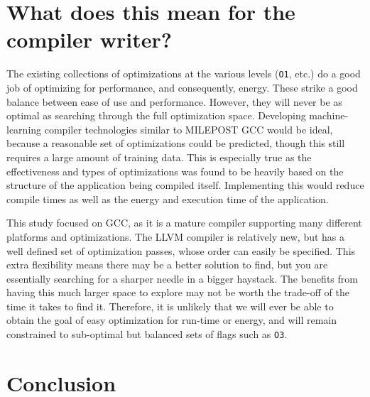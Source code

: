 \documentclass[twocolumn]{article}
\begin{document}




\section{What does this mean for the compiler writer?}

The existing collections of optimizations at the various levels (\texttt{O1}, etc.) do a good job of optimizing for performance, and consequently, energy. These strike a good balance between ease of use and performance. However, they will never be as optimal as searching through the full optimization space. Developing machine-learning compiler technologies similar to MILEPOST GCC would be ideal, because a reasonable set of optimizations could be predicted, though this still requires a large amount of training data. This is especially true as the effectiveness and types of optimizations was found to be heavily based on the structure of the application being compiled itself. Implementing this would reduce compile times as well as the energy and execution time of the application.

This study focused on GCC, as it is a mature compiler supporting many different platforms and optimizations. The LLVM compiler is relatively new, but has a well defined set of optimization passes, whose order can easily be specified. This extra flexibility means there may be a better solution to find, but you are essentially searching for a sharper needle in a bigger haystack. The benefits from having this much larger space to explore may not be worth the trade-off of the time it takes to find it. Therefore, it is unlikely that we will ever be able to obtain the goal of easy optimization for run-time or energy, and will remain constrained to sub-optimal but balanced sets of flags such as \texttt{O3}.


\section{Conclusion}
\end{document}

